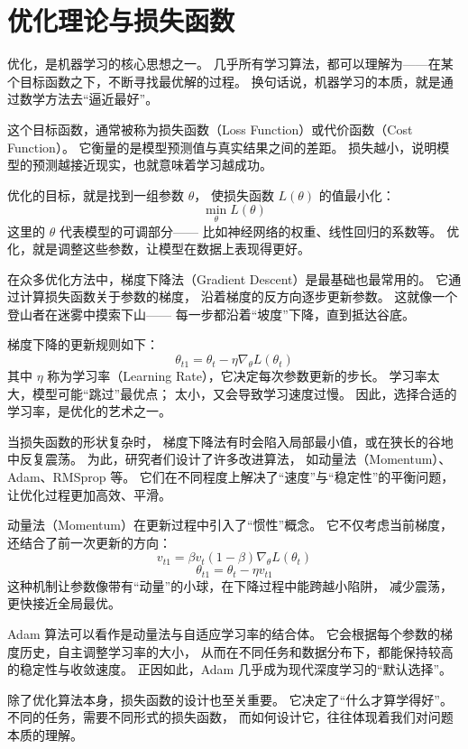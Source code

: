 \section{优化理论与损失函数}

优化，是机器学习的核心思想之一。  
几乎所有学习算法，都可以理解为——在某个目标函数之下，不断寻找最优解的过程。  
换句话说，机器学习的本质，就是通过数学方法去“逼近最好”。

这个目标函数，通常被称为损失函数（Loss Function）或代价函数（Cost Function）。  
它衡量的是模型预测值与真实结果之间的差距。  
损失越小，说明模型的预测越接近现实，也就意味着学习越成功。

优化的目标，就是找到一组参数 $\theta$，  
使损失函数 $L(\theta)$ 的值最小化：
$$
\min_{\theta} L(\theta)
$$  
这里的 $\theta$ 代表模型的可调部分——  
比如神经网络的权重、线性回归的系数等。  
优化，就是调整这些参数，让模型在数据上表现得更好。

在众多优化方法中，梯度下降法（Gradient Descent）是最基础也最常用的。  
它通过计算损失函数关于参数的梯度，  
沿着梯度的反方向逐步更新参数。  
这就像一个登山者在迷雾中摸索下山——  
每一步都沿着“坡度”下降，直到抵达谷底。

梯度下降的更新规则如下：
$$
\theta_{t1} = \theta_t - \eta \nabla_\theta L(\theta_t)
$$  
其中 $\eta$ 称为学习率（Learning Rate），它决定每次参数更新的步长。  
学习率太大，模型可能“跳过”最优点；  
太小，又会导致学习速度过慢。  
因此，选择合适的学习率，是优化的艺术之一。

当损失函数的形状复杂时，  
梯度下降法有时会陷入局部最小值，或在狭长的谷地中反复震荡。  
为此，研究者们设计了许多改进算法，  
如动量法（Momentum）、Adam、RMSprop 等。  
它们在不同程度上解决了“速度”与“稳定性”的平衡问题，  
让优化过程更加高效、平滑。

动量法（Momentum）在更新过程中引入了“惯性”概念。  
它不仅考虑当前梯度，还结合了前一次更新的方向：  
$$
v_{t1} = \beta v_t  (1 - \beta) \nabla_\theta L(\theta_t)
$$  
$$
\theta_{t1} = \theta_t - \eta v_{t1}
$$  
这种机制让参数像带有“动量”的小球，在下降过程中能跨越小陷阱，  
减少震荡，更快接近全局最优。

Adam 算法可以看作是动量法与自适应学习率的结合体。  
它会根据每个参数的梯度历史，自主调整学习率的大小，  
从而在不同任务和数据分布下，都能保持较高的稳定性与收敛速度。  
正因如此，Adam 几乎成为现代深度学习的“默认选择”。

除了优化算法本身，损失函数的设计也至关重要。  
它决定了“什么才算学得好”。  
不同的任务，需要不同形式的损失函数，  
而如何设计它，往往体现着我们对问题本质的理解。

